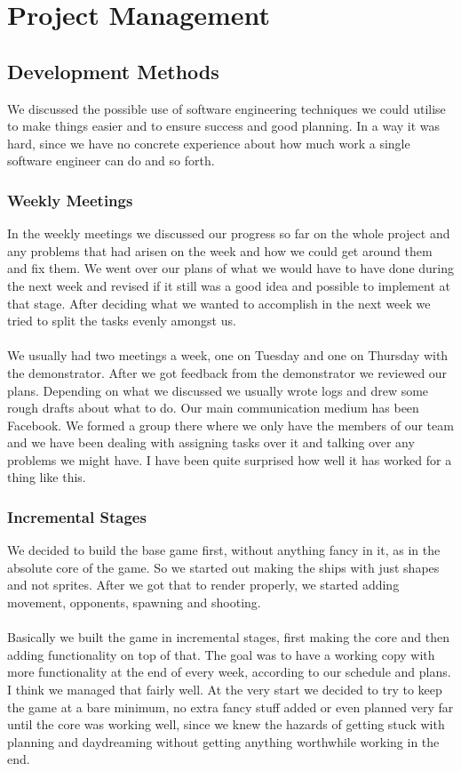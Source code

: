 
\chapter{Project Management}
\label{cha:management}

\section{Development Methods}
\label{sec: development_methods}

We discussed the possible use of software engineering techniques we could utilise to make things easier and to ensure success and good planning. In a way it was hard, since we have no concrete experience about how much work a single software engineer can do and so forth.

\subsection{Weekly Meetings}
In the weekly meetings we discussed our progress so far on the whole project and any problems that had arisen on the week and how we could get around them and fix them. We went over our plans of what we would have to have done during the next week and revised if it still was a good idea and possible to implement at that stage. After deciding what we wanted to accomplish in the next week we tried to split the tasks evenly amongst us.
\\ \\
We usually had two meetings a week, one on Tuesday and one on Thursday with the demonstrator. After we got feedback from the demonstrator we reviewed our plans. Depending on what we discussed we usually wrote logs and drew some rough drafts about what to do. Our main communication medium has been Facebook. We formed a group there where we only have the members of our team and we have been dealing with assigning tasks over it and talking over any problems we might have. I have been quite surprised how well it has worked for a thing like this.

\subsection{Incremental Stages}
We decided to build the base game first, without anything fancy in it, as in the absolute core of the game. So we started out making the ships with just shapes and not sprites. After we got that to render properly, we started adding movement, opponents, spawning and shooting. \\\\
Basically we built the game in incremental stages, first making the core and then adding functionality on top of that. The goal was to have a working copy with more functionality at the end of every week, according to our schedule and plans. I think we managed that fairly well. At the very start we decided to try to keep the game at a bare minimum, no extra fancy stuff added or even planned very far until the core was working well, since we knew the hazards of getting stuck with planning and daydreaming without getting anything worthwhile working in the end.

